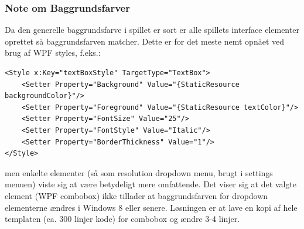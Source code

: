 \subsubsection{Note om Baggrundsfarver}
Da den generelle baggrundsfarve i spillet er sort er alle spillets interface elementer oprettet så baggrundsfarven matcher. Dette er for det meste nemt opnået ved brug af WPF styles, f.eks.:
\begin{lstlisting}
<Style x:Key="textBoxStyle" TargetType="TextBox">
    <Setter Property="Background" Value="{StaticResource backgroundColor}"/>
    <Setter Property="Foreground" Value="{StaticResource textColor}"/>
    <Setter Property="FontSize" Value="25"/>
    <Setter Property="FontStyle" Value="Italic"/>
    <Setter Property="BorderThickness" Value="1"/>
</Style>
\end{lstlisting}
men enkelte elementer (så som resolution dropdown menu, brugt i settings menuen) viste sig at være betydeligt mere omfattende. Det viser sig at det valgte element (WPF combobox) ikke tillader at baggrundsfarven for dropdown elementerne ændres i Windows 8 eller senere. Løsningen er at lave en kopi af hele templaten (ca. 300 linjer kode) for combobox og ændre 3-4 linjer. \cite{comboBox}

\newpage
